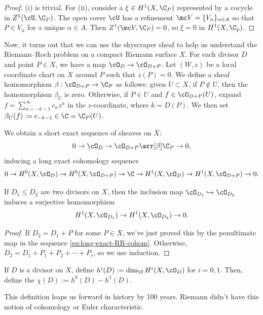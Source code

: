 \documentclass[11pt]{report}
\begin{document}
\begin{proof}
(i) is trivial. For (ii), consider a $\xi \in H^1(X, \C_P)$ represented by a cocycle in $Z^1(\cU,\C_P)$. The open cover $\cU$ has a refinement $\mc V= \{V_\alpha\}_{\alpha \in A}$ so that $P \in V_\alpha$ for a unique $\alpha \in A$.  Then $Z^1(\mc V,\C_P)=0$, so $\xi =0$ in $H^1(X,\C_p)$.
\end{proof}

Now, it turns out that we can use the skyscraper sheaf to help us understand the Riemann--Roch problem on a compact Riemann surface $X$. For each divisor $D$ and point $P \in X$, we have a map $\cO_D \to \cO_{D+P}$. Let $(W,z)$ be a local coordinate chart on $X$ around $P$ such that $z(P)=0$. We define a sheaf homomorphism $\beta :\cO_{D+P} \to \C_P$ as follows: given $U \subset X$, if $P \not \in U$, then the homomorphism $\beta_U$ is zero. Otherwise, if $P \in U$ and $f \in \cO_{D+P}(U)$, expand $f = \sum_{n=-k-1}^\infty c_nz^n$ in the $z$-coordinate, where $k = D(P)$. We then set $\beta_U(f):= c_{-k-1} \in \C= \C_P(U)$.

We obtain a short exact sequence of sheaves on $X:$
\[
0 \to \cO_D \to \cO_{D+P}\arr[\beta] \C_P \to 0,
\]
inducing a long exact cohomology sequence
\begin{align} \label{eq:long-exact-RR-cohom}
0 \to H^0(X,\cO_D) \to H^0(X,\cO_{D+P}) \to \C \to H^1(X,\cO_D) \to H^1(X,\cO_{D+P})\to 0.    
\end{align}

\begin{cor}
    If $D_1 \leq D_2$ are two divisors on $X$, then the inclusion map $\cO_{D_1}\hookrightarrow \cO_{D_2}$ induces a surjective homomorphism
    \[
    H^1(X, \cO_{D_1}) \to H^1(X, \cO_{D_2}) \to 0.
    \]
\end{cor}

\begin{proof}
If $D_2 = D_1 + P$ for some $P \in X$, we've just proved this by the penultimate map in the sequence \eqref{eq:long-exact-RR-cohom}. Otherwise, $D_2 = D_1 + P_1 + P_2 + \cdots + P_r$, so we use induction.
\end{proof}

\begin{defn}
If $D$ is a divisor on $X$, define $h^i(D):= \dim_\C H^i(X,\cO_D)$ for $i = 0,1$. Then, define the  $\chi(D):= h^0(D)- h^1(D)$.
\end{defn}

\begin{notethm*}
    This definition leaps us forward in history by 100 years. Riemann didn't have this notion of cohomology or Euler characteristic.
\end{notethm*}
\end{document}
